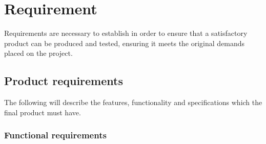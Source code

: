 \section{Requirement}
\label{section:requirement}

Requirements are necessary to establish in order to ensure that a satisfactory product can be produced and tested, ensuring it meets the original demands placed on the project.

\subsection{Product requirements}

The following will describe the features, functionality and specifications which the final product must have.



\subsubsection{Functional requirements}

